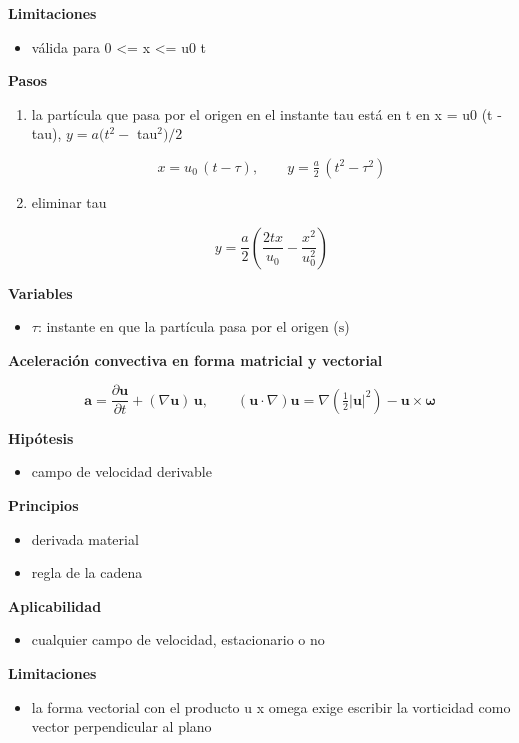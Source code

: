 \documentclass[10pt,openany]{book}
\begin{document}
\begin{tcolorbox}[title={Desarrollos del modelo}, studiumdef, breakable]
\noindent\textbf{Limitaciones}
\begin{itemize}
\item válida para 0 <= x <= u0 t
\end{itemize}

\noindent\textbf{Pasos}
\begin{enumerate}
\item
la partícula que pasa por el origen en el instante tau está en t en x = u0 (t - tau), \(y = a (t^2 -\) tau\(^2)/2\)

\[
x = u_0\,(t - \tau),\qquad y = \tfrac{a}{2}\,(t^{2} - \tau^{2})
\]
\item
eliminar tau

\[
y = \frac{a}{2}\left(\frac{2 t x}{u_0} - \frac{x^{2}}{u_0^{2}}\right)
\]
\end{enumerate}

\noindent\textbf{Variables}
\begin{itemize}
\item $\tau$: instante en que la partícula pasa por el origen ($\mathrm{s}$)
\end{itemize}



\noindent\textbf{Aceleración convectiva en forma matricial y vectorial}

\begin{equation}
\mathbf{a} = \frac{\partial\mathbf{u}}{\partial t} + (\nabla\mathbf{u})\,\mathbf{u},\qquad (\mathbf{u}\cdot\nabla)\mathbf{u} = \nabla\!\left(\tfrac12|\mathbf{u}|^{2}\right) - \mathbf{u}\times\boldsymbol{\omega}
\label{eq:c04-aceleracion-matricial}
\end{equation}

\noindent\textbf{Hipótesis}
\begin{itemize}
\item campo de velocidad derivable
\end{itemize}

\noindent\textbf{Principios}
\begin{itemize}
\item derivada material
\item regla de la cadena
\end{itemize}

\noindent\textbf{Aplicabilidad}
\begin{itemize}
\item cualquier campo de velocidad, estacionario o no
\end{itemize}

\noindent\textbf{Limitaciones}
\begin{itemize}
\item la forma vectorial con el producto u x omega exige escribir la vorticidad como vector perpendicular al plano
\end{itemize}


\end{tcolorbox}
\end{document}
